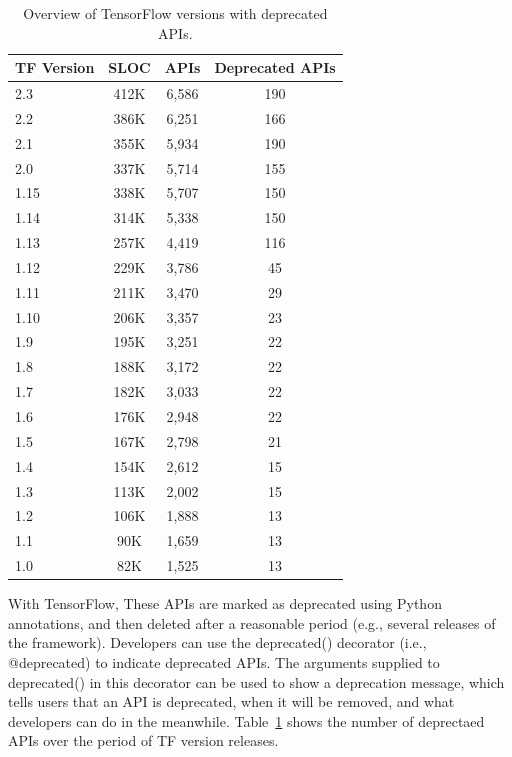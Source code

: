 \documentclass[12pt,letterpaper]{report}
\begin{document}
\begin{table}[h]
    \begin{center}
    \begin{tabular}{|l|c|c|c|}
    \hline
         TF Version & SLOC & APIs & Deprecated APIs \\
    \hline\hline 
    2.3 & 412K & 6,586 & 190 \\
    2.2 & 386K & 6,251 & 166 \\
    2.1 & 355K & 5,934 & 190 \\
    2.0 & 337K & 5,714 & 155 \\
    1.15 & 338K & 5,707 & 150 \\
    1.14 & 314K & 5,338 & 150 \\
    1.13 & 257K & 4,419 & 116 \\
    1.12 & 229K & 3,786 & 45 \\
    1.11 & 211K & 3,470 & 29 \\
    1.10 & 206K & 3,357 & 23 \\
    1.9 & 195K & 3,251 & 22 \\
    1.8 & 188K & 3,172 & 22 \\
    1.7 & 182K & 3,033 & 22 \\
    1.6 & 176K & 2,948 & 22 \\
    1.5 & 167K & 2,798 & 21 \\
    1.4 & 154K & 2,612 & 15 \\
    1.3 & 113K & 2,002 & 15 \\
    1.2 & 106K & 1,888 & 13 \\
    1.1 & 90K & 1,659 & 13 \\
    1.0 & 82K & 1,525 & 13 \\
    \hline
    \end{tabular}
    \end{center}
    \caption{Overview of TensorFlow versions with deprecated APIs.\label{versionsDep}}
 \end{table}

With TensorFlow, These APIs are marked as deprecated using Python annotations, and then deleted after a reasonable period (e.g., several releases of the framework).
Developers can use the deprecated() decorator (i.e., @deprecated) to indicate deprecated APIs. The arguments supplied to deprecated() in this decorator can be used to show a deprecation message, which tells users that an API is deprecated, when it will be removed, and what developers can do in the meanwhile. Table~\ref{versionsDep} shows the number of deprectaed APIs over the period of TF version releases.  
\end{document}
